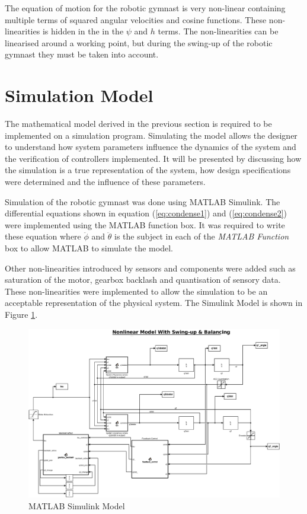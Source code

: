 \documentclass[a4paper,12pt]{article}
\begin{document}
	
	
	The equation of motion for the robotic gymnast is very non-linear containing multiple terms of squared angular velocities and cosine functions. These non-linearities is hidden in the in the $\psi$ and $h$ terms. The non-linearities can be linearised around a working point, but during the swing-up of the robotic gymnast they must be taken into account.
	
	\section{Simulation Model}
 	The mathematical model derived in the previous section is required to be implemented on a simulation program. Simulating the model allows the designer to understand how system parameters influence the dynamics of the system and the verification of controllers implemented. It will be presented by discussing how the simulation is a true representation of the system, how design specifications were determined and the influence of these parameters.
	
	Simulation of the robotic gymnast was done using MATLAB Simulink. The differential equations shown in equation (\ref{eq:condense1}) and (\ref{eq:condense2}) were implemented using the MATLAB function box. It was required to write these equation where $\ddot{\phi}$ and $\ddot{\theta}$ is the subject in each of the \textit{MATLAB Function} box to allow MATLAB to simulate the model.
	
	Other non-linearities introduced by sensors and components were added such as saturation of the motor, gearbox backlash and quantisation of sensory data. These non-linearities were implemented to allow the simulation to be an acceptable representation of the physical system. The Simulink Model is shown in Figure \ref{fig:sim_nonlinearfeedback}.
	
	\begin{figure}[h]
		\centering
		\includegraphics[scale=0.3]{simulink_model.eps}
		\caption{MATLAB Simulink Model}
		\label{fig:sim_nonlinearfeedback}
	\end{figure}
\end{document}
